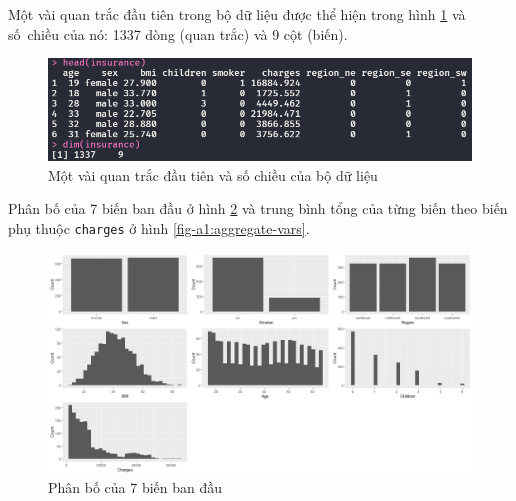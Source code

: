 Một vài quan trắc đầu tiên trong bộ dữ liệu được thể hiện trong hình \ref{fig-a1:head-dataset} và số~chiều của nó: 1337 dòng (quan trắc) và 9 cột (biến).
\begin{figure}[H]
	\centering
	\includegraphics[width=0.9\linewidth]{images/A1/head-dataset}
	\caption{Một vài quan trắc đầu tiên và số chiều của bộ dữ liệu}
	\label{fig-a1:head-dataset}
\end{figure}

Phân bố của 7 biến ban đầu ở hình \ref{fig-a1:plot-vars} và trung bình tổng của từng biến theo biến phụ thuộc \texttt{charges} ở hình \ref{fig-a1:aggregate-vars}.
\begin{figure}[H]
	\centering
	\includegraphics[width=1\linewidth]{images/A1/plot-vars}
	\caption{Phân bố của 7 biến ban đầu}
	\label{fig-a1:plot-vars}
\end{figure}

